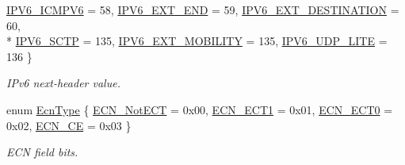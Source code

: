 \begin{DoxyCompactItemize}
\hyperlink{classns3_1_1Ipv6Header_a226429221a066c5e3b1f260caf27d1e9a5a1ba2c977ece2a8089761a3bd2e5478}{I\+P\+V6\+\_\+\+I\+C\+M\+P\+V6} = 58, 
\hyperlink{classns3_1_1Ipv6Header_a226429221a066c5e3b1f260caf27d1e9a1bedea6222ce2f8610f33a70517ce2bc}{I\+P\+V6\+\_\+\+E\+X\+T\+\_\+\+E\+ND} = 59, 
\hyperlink{classns3_1_1Ipv6Header_a226429221a066c5e3b1f260caf27d1e9abfe6e82da1c9945685a3bf9dbfbe974b}{I\+P\+V6\+\_\+\+E\+X\+T\+\_\+\+D\+E\+S\+T\+I\+N\+A\+T\+I\+ON} = 60, 
\\*
\hyperlink{classns3_1_1Ipv6Header_a226429221a066c5e3b1f260caf27d1e9a342811ca9ba9b8a6e6d4a5183911d6f4}{I\+P\+V6\+\_\+\+S\+C\+TP} = 135, 
\hyperlink{classns3_1_1Ipv6Header_a226429221a066c5e3b1f260caf27d1e9ac0c0affdd753b9d7593226d623f9d9dc}{I\+P\+V6\+\_\+\+E\+X\+T\+\_\+\+M\+O\+B\+I\+L\+I\+TY} = 135, 
\hyperlink{classns3_1_1Ipv6Header_a226429221a066c5e3b1f260caf27d1e9aa2b28883229743bf1235b03f55d77e0f}{I\+P\+V6\+\_\+\+U\+D\+P\+\_\+\+L\+I\+TE} = 136
 \}\begin{DoxyCompactList}\small\item\em I\+Pv6 next-\/header value. \end{DoxyCompactList}
\item 
enum \hyperlink{classns3_1_1Ipv6Header_a8d6d294ba3232974841ebd721de29ace}{Ecn\+Type} \{ \hyperlink{classns3_1_1Ipv6Header_a8d6d294ba3232974841ebd721de29acea03ab8621f6ef3f90195d18662010ea7d}{E\+C\+N\+\_\+\+Not\+E\+CT} = 0x00, 
\hyperlink{classns3_1_1Ipv6Header_a8d6d294ba3232974841ebd721de29acea624c2f69d3134798bd3b6434790dc91a}{E\+C\+N\+\_\+\+E\+C\+T1} = 0x01, 
\hyperlink{classns3_1_1Ipv6Header_a8d6d294ba3232974841ebd721de29aceaa770e7df7d7b104c4679cbb24fa7ecb9}{E\+C\+N\+\_\+\+E\+C\+T0} = 0x02, 
\hyperlink{classns3_1_1Ipv6Header_a8d6d294ba3232974841ebd721de29aceaced0dc325d535e6fe104e5c5b9678241}{E\+C\+N\+\_\+\+CE} = 0x03
 \}\begin{DoxyCompactList}\small\item\em E\+CN field bits. \end{DoxyCompactList}
\end{DoxyCompactItemize}
